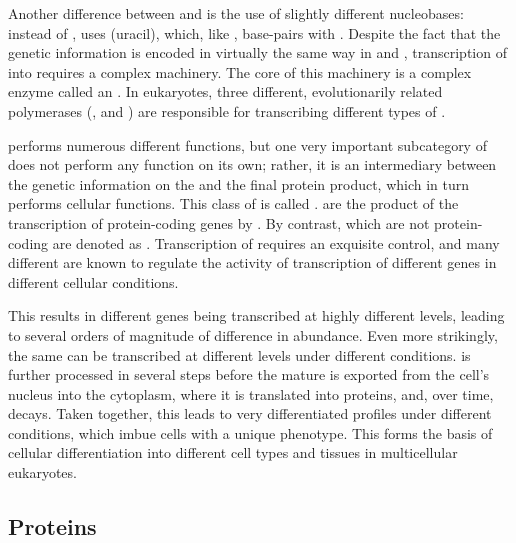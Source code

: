 Another difference between \dna and \rna is the use of slightly different
nucleobases: instead of \nT, \rna uses \nU (uracil), which, like \nT, base-pairs
with \nA. Despite the fact that the genetic information is encoded in virtually
the same way in \dna and \rna, transcription of \dna into \rna requires a
complex machinery. The core of this machinery is a complex enzyme called an
. In eukaryotes, three different, evolutionarily related
\rna polymerases (,  and ) are responsible for transcribing
different types of \rna.

\rna performs numerous different functions, but one very important subcategory
of \rna does not perform any function on its own; rather, it is an intermediary
between the genetic information on the \dna and the final protein product, which
in turn performs cellular functions. This class of \rna is called \mrna.
\mrna[s] are the product of the transcription of protein-coding genes by .
By contrast, \rna[s] which are not protein-coding are denoted as \ncrna.
Transcription of \mrna requires an exquisite control, and many different \tf[s]
are known to regulate the activity of transcription of different genes in
different cellular conditions.

This results in different \mrna genes being transcribed at highly different
levels, leading to several orders of magnitude of difference in \mrna abundance.
Even more strikingly, the same \mrna can be transcribed at different levels
under different conditions. \mrna is further processed in several steps before
the mature \mrna is exported from the cell’s nucleus into the cytoplasm, where
it is translated into proteins, and, over time, decays. Taken together, this
leads to very differentiated \mrna profiles under different conditions, which
imbue cells with a unique phenotype. This forms the basis of cellular
differentiation into different cell types and tissues in multicellular
eukaryotes.

\subsection{Proteins}


